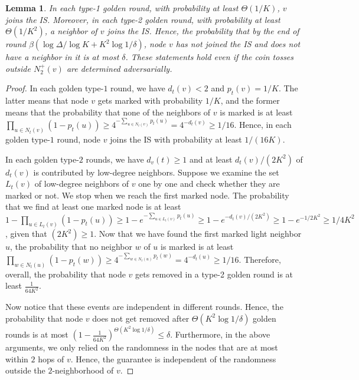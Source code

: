 \documentclass[11pt]{article}
\newcommand{\ktodo}[1]{\todo[color=yellow]{\textbf{Keren}: #1}}
\newtheorem{lemma}[theorem]{Lemma}
\begin{document}
\begin{lemma}\label{lem:removalPerRound} In each type-1 golden round, with probability at least $\Theta(1/K)$, $v$ joins the IS. Moreover, in each type-2 golden round, with probability at least $\Theta(1/K^2)$, a neighbor of $v$ joins the IS.  Hence, the probability that by the end of round $\beta(\log\Delta/\log K + K^2 \log 1/\delta)$, node $v$ has not joined the IS and does not have a neighbor in it is at most $\delta$. These statements hold even if the coin tosses outside $N^+_{2}(v)$ are determined adversarially.%
\end{lemma}
\begin{proof} In each golden type-$1$ round, we have $d_t(v)<2$ and $p_{t}(v)= 1/K$. The latter means that node $v$ gets marked with probability $1/K$, and the former means that the probability that none of the neighbors of $v$ is marked is at least $\prod_{u\in N_{t}(v)} (1-p_{t}(u)) \geq 4^{-\sum_{u\in N_{t}(v)} p_{t}(u)} = 4^{-d_{t}(v)}\geq 1/16$. Hence, in each golden type-$1$ round, node $v$ joins the IS with probability at least $1/(16K)$. 

In each golden type-$2$ rounds, we have $d_{v}(t)\geq 1$ and at least $d_{t}(v)/(2K^2)$ of $d_{t}(v)$ is contributed by low-degree neighbors. Suppose we examine the set $L_{t}(v)$ of low-degree neighbors of $v$ one by one and check whether they are marked or not. We stop when we reach the first marked node. The probability that we find at least one marked node is at least $1-\prod_{u\in L_{t}(v)} (1-p_{t}(u)) \geq 1-e^{-\sum_{u\in L_{t}(v)} p_{t}(u)} \geq 1-e^{-d_{t}(v)/(2K^2)} \geq 1-e^{-1/2K^2}\geq 1/4K^2$, given that $(2K^2)\geq 1$. Now that we have found the first marked light neighbor $u$, the probability that no neighbor $w$ of $u$ is marked is at least $\prod_{w\in N_{t}(u)} (1-p_{t}(w)) \geq 4^{-\sum_{w\in N_{t}(u)} p_{t}(w)} = 4^{-d_{t}(u)}\geq 1/16$. Therefore, overall, the probability that node $v$ gets removed in a type-2 golden round is at least $\frac{1}{64K^2}$. 

Now notice that these events are independent in different rounds. Hence, the probability that node $v$ does not get removed after $\Theta(K^2\log 1/\delta)$ golden rounds is at most $(1-\frac{1}{64K^2})^{\Theta(K^2\log 1/\delta)} \leq \delta$. Furthermore, in the above arguments, we only relied on the randomness in the nodes that are at most within $2$ hops of $v$. Hence, the guarantee is independent of the randomness outside the $2$-neighborhood of $v$.
\end{proof}
\end{document}
